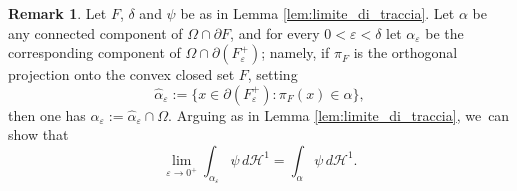 \documentclass[11pt]{article}
\numberwithin{equation}{section}
\let\eps\varepsilon
\let\Om\Omega
\theoremstyle{definition}
\newtheorem{remark}[theorem]{Remark}
\begin{document}
\begin{remark} \label{rem:limite_di_traccia} Let $F$, $\delta$ and $\psi$ be as in Lemma \ref{lem:limite_di_traccia}.
Let $\alpha$ be any connected component of $\Om\cap\partial F$, and for every $0<\eps<\delta$ let $\alpha_\eps$ be the corresponding component of $\Om\cap\partial (F^+_\eps)$; namely, if $\pi_F$ is the orthogonal projection onto the convex closed set $F$, setting
\[
\widehat\alpha_\eps:=\{x\in \partial (F^+_\eps):\pi_F(x)\in \alpha\},
\]
then one has $\alpha_\eps:=\widehat\alpha_\eps\cap \Om$.
Arguing as in Lemma \ref{lem:limite_di_traccia}, we~can show that
\begin{equation*}
\lim_{\eps\to0^+}
\int_{\alpha_\eps}\psi\,d\mathcal{H}^1=\int_{\alpha}\psi\,d\mathcal{H}^1.
\end{equation*}
\end{remark}
\end{document}
